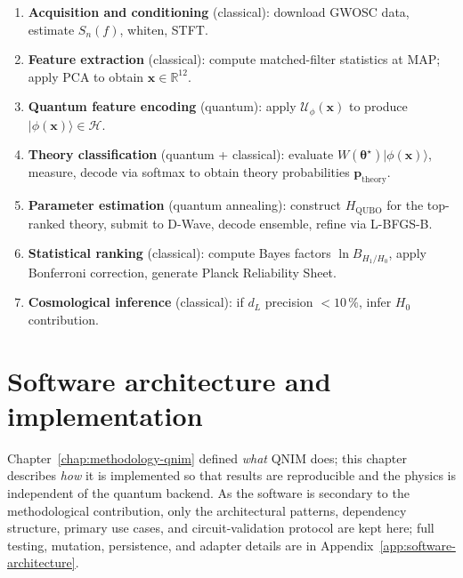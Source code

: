 \documentclass[11pt,a4paper, english]{book}
\theoremstyle{plain}
\theoremstyle{definition}
\numberwithin{equation}{chapter}
\numberwithin{figure}{chapter}
\numberwithin{table}{chapter}
\begin{document}
\begin{enumerate}
  \item \textbf{Acquisition and conditioning} (classical):
        download GWOSC data, estimate $S_n(f)$, whiten, STFT.

  \item \textbf{Feature extraction} (classical):
        compute matched-filter statistics at MAP; apply PCA to
        obtain $\mathbf{x} \in \mathbb{R}^{12}$.

  \item \textbf{Quantum feature encoding} (quantum):
        apply $\mathcal{U}_\phi(\mathbf{x})$ to produce
        $|\phi(\mathbf{x})\rangle \in \mathcal{H}$.

  \item \textbf{Theory classification} (quantum + classical):
        evaluate $W(\boldsymbol{\theta}^\star)|\phi(\mathbf{x})\rangle$,
        measure, decode via softmax to obtain theory probabilities
        $\mathbf{p}_\mathrm{theory}$.

  \item \textbf{Parameter estimation} (quantum annealing):
        construct $H_\mathrm{QUBO}$ for the top-ranked theory, submit
        to D-Wave, decode ensemble, refine via L-BFGS-B.

  \item \textbf{Statistical ranking} (classical):
        compute Bayes factors $\ln B_{H_1/H_0}$, apply Bonferroni
        correction, generate Planck Reliability Sheet.

  \item \textbf{Cosmological inference} (classical):
        if $d_L$ precision $< 10\,\%$, infer $H_0$ contribution.
\end{enumerate}



\chapter{Software architecture and implementation}
\label{chap:software}

Chapter~\ref{chap:methodology-qnim} defined \emph{what} QNIM does; this chapter
describes \emph{how} it is implemented so that results are reproducible and
the physics is independent of the quantum backend. As the software is
secondary to the methodological contribution, only the architectural
patterns, dependency structure, primary use cases, and circuit-validation
protocol are kept here; full testing, mutation, persistence, and adapter
details are in Appendix~\ref{app:software-architecture}.
\end{document}
